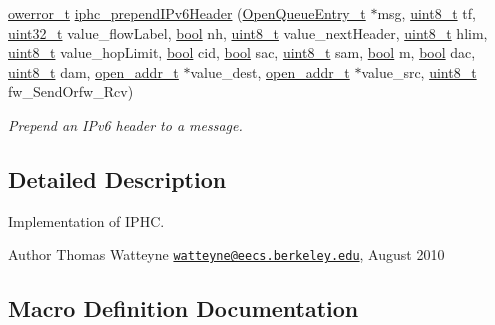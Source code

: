 \begin{DoxyCompactItemize}
\hyperlink{opendefs_8h_af20b7c3ed9d2ba19e56a309ad9314803}{owerror\+\_\+t} \hyperlink{group___i_p_h_c_ga5c71ec3ac9733a597e3e945129814830}{iphc\+\_\+prepend\+I\+Pv6\+Header} (\hyperlink{struct_open_queue_entry__t}{Open\+Queue\+Entry\+\_\+t} $\ast$msg, \hyperlink{_p_e___types_8h_aba7bc1797add20fe3efdf37ced1182c5}{uint8\+\_\+t} tf, \hyperlink{_p_e___types_8h_a33594304e786b158f3fb30289278f5af}{uint32\+\_\+t} value\+\_\+flow\+Label, \hyperlink{_p_e___types_8h_a97a80ca1602ebf2303258971a2c938e2}{bool} nh, \hyperlink{_p_e___types_8h_aba7bc1797add20fe3efdf37ced1182c5}{uint8\+\_\+t} value\+\_\+next\+Header, \hyperlink{_p_e___types_8h_aba7bc1797add20fe3efdf37ced1182c5}{uint8\+\_\+t} hlim, \hyperlink{_p_e___types_8h_aba7bc1797add20fe3efdf37ced1182c5}{uint8\+\_\+t} value\+\_\+hop\+Limit, \hyperlink{_p_e___types_8h_a97a80ca1602ebf2303258971a2c938e2}{bool} cid, \hyperlink{_p_e___types_8h_a97a80ca1602ebf2303258971a2c938e2}{bool} sac, \hyperlink{_p_e___types_8h_aba7bc1797add20fe3efdf37ced1182c5}{uint8\+\_\+t} sam, \hyperlink{_p_e___types_8h_a97a80ca1602ebf2303258971a2c938e2}{bool} m, \hyperlink{_p_e___types_8h_a97a80ca1602ebf2303258971a2c938e2}{bool} dac, \hyperlink{_p_e___types_8h_aba7bc1797add20fe3efdf37ced1182c5}{uint8\+\_\+t} dam, \hyperlink{structopen__addr__t}{open\+\_\+addr\+\_\+t} $\ast$value\+\_\+dest, \hyperlink{structopen__addr__t}{open\+\_\+addr\+\_\+t} $\ast$value\+\_\+src, \hyperlink{_p_e___types_8h_aba7bc1797add20fe3efdf37ced1182c5}{uint8\+\_\+t} fw\+\_\+\+Send\+Orfw\+\_\+\+Rcv)
\begin{DoxyCompactList}\small\item\em Prepend an I\+Pv6 header to a message. \end{DoxyCompactList}\end{DoxyCompactItemize}


\subsection{Detailed Description}
Implementation of I\+P\+HC. 

\begin{DoxyAuthor}{Author}
Thomas Watteyne \href{mailto:watteyne@eecs.berkeley.edu}{\tt watteyne@eecs.\+berkeley.\+edu}, August 2010 
\end{DoxyAuthor}


\subsection{Macro Definition Documentation}
